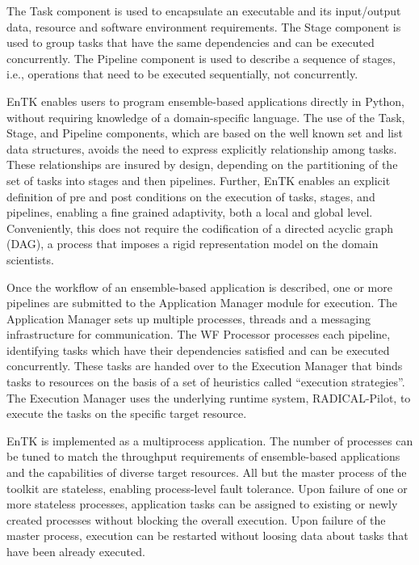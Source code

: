\documentclass[conference]{IEEEtran}
\begin{document}
The Task component is used to encapsulate an executable  and its input/output
data, resource and software environment requirements. The Stage component is
used to group tasks that have the same dependencies and can be executed
concurrently. The Pipeline component is used to describe a sequence of
stages, i.e., operations that need to be executed sequentially, not concurrently.

EnTK enables users to program ensemble-based applications directly in Python,
without requiring knowledge of a domain-specific language. The use of the
Task, Stage, and Pipeline components, which are based on the well known set
and list data structures, avoids the need to express explicitly relationship
among tasks. These relationships are insured by design, depending on the
partitioning of the set of tasks into stages and then pipelines. Further,
EnTK enables an explicit definition of pre and post conditions on the
execution of tasks, stages, and pipelines, enabling a fine grained
adaptivity, both a local and global level. Conveniently, this does not
require the codification of a directed acyclic graph (DAG), a process that imposes a rigid
representation model on the domain scientists.

%
%
%
%
%
%
%
%

%
%
%
%
%
%
%

Once the workflow of an ensemble-based application is described, one or more
pipelines are submitted to the Application Manager module for execution. The
Application Manager sets up multiple processes, threads and a messaging
infrastructure for communication. The WF Processor processes each pipeline,
identifying tasks which have their dependencies satisfied and can be executed
concurrently. These tasks are handed over to the Execution Manager that binds
tasks to resources on the basis of a set of heuristics called ``execution
strategies''. The Execution Manager uses the underlying runtime system,
RADICAL-Pilot, to execute the tasks on the specific target resource.

EnTK is implemented as a multiprocess application. The number of processes
can be tuned to match the throughput requirements of ensemble-based
applications and the capabilities of diverse target resources. All but the
master process of the toolkit are stateless, enabling process-level fault
tolerance. Upon failure of one or more stateless processes, application tasks
can be assigned to existing or newly created processes without blocking the
overall execution. Upon failure of the master process, execution can be
restarted without loosing data about tasks that have been already executed.
\end{document}
